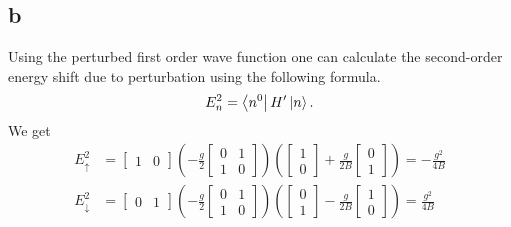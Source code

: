 \documentclass[11pt]{amsart}
\begin{document}
\subsection*{b}
Using the perturbed first order wave function one can calculate the second-order energy shift due to perturbation using the following formula.
\begin{equation}
E^2_n = \bra{n^0}H'\ket{n}.
\end{equation}
We get
\begin{align*}
E_\uparrow^2 &= \begin{bmatrix}
1 & 0
\end{bmatrix} 
\left(
-\frac{g}{2}
\begin{bmatrix}
0 & 1 \\
1 & 0
\end{bmatrix}
\right)
\left(
\begin{bmatrix}
1 \\ 0
\end{bmatrix}
+\frac{g}{2B}
\begin{bmatrix}
0 \\ 1
\end{bmatrix}
\right)
= -\frac{g^2}{4B} \\
E_\downarrow^2 &= \begin{bmatrix}
0 & 1
\end{bmatrix} 
\left(
-\frac{g}{2}
\begin{bmatrix}
0 & 1 \\
1 & 0
\end{bmatrix}
\right)
\left(
\begin{bmatrix}
0 \\ 1
\end{bmatrix}
-\frac{g}{2B}
\begin{bmatrix}
1 \\ 0
\end{bmatrix}
\right)
= \frac{g^2}{4B}
\end{align*}
\end{document}
